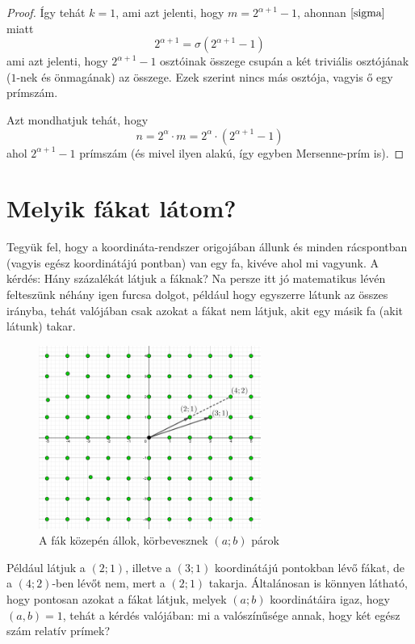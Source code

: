 \documentclass[12pt]{book}
\theoremstyle{plain} %
\theoremstyle{definition} %
\theoremstyle{remark}
\numberwithin{equation}{section}  %
\begin{document}
\begin{proof}
		Így tehát $k=1$, ami azt jelenti, hogy $m=2^{\alpha+1}-1$, ahonnan $\ref{sigma}$ miatt
		\[ 2^{\alpha+1} = \sigma(2^{\alpha+1}-1)  \]
		ami azt jelenti, hogy $2^{\alpha+1}-1$ osztóinak összege csupán a két triviális osztójának ($1$-nek és önmagának) az összege. Ezek szerint nincs más osztója, vagyis ő egy prímszám.
		
		Azt mondhatjuk tehát, hogy
		\[ n = 2^{\alpha} \cdot m = 2^{\alpha} \cdot (2^{\alpha+1} - 1)  \]
		ahol $2^{\alpha+1}-1$ prímszám (és mivel ilyen alakú, így egyben Mersenne-prím is).	
	\end{proof}
	
	
	\section{Melyik fákat látom?}
	
	Tegyük fel, hogy a koordináta-rendszer origojában állunk és minden rácspontban (vagyis egész koordinátájú pontban) van egy fa, kivéve ahol mi vagyunk. A kérdés: Hány százalékát látjuk a fáknak? Na persze itt jó matematikus lévén felteszünk néhány igen furcsa dolgot, például hogy egyszerre látunk az összes irányba, tehát valójában csak azokat a fákat nem látjuk, akit egy másik fa (akit látunk) takar.
	
	\begin{figure}[h] %
		\centering
		\includegraphics[height=6cm]{fak.png}
		\caption{A fák közepén állok, körbevesznek $(a;b)$ párok}\label{fak}
	\end{figure}

	Például látjuk a $(2;1)$, illetve a $(3;1)$ koordinátájú pontokban lévő fákat, de a $(4;2)$-ben lévőt nem, mert a $(2;1)$ takarja. Általánosan is könnyen látható, hogy pontosan azokat a fákat látjuk, melyek $(a;b)$ koordinátáira igaz, hogy $(a,b)=1$, tehát a kérdés valójában: mi a valószínűsége annak, hogy két egész szám relatív prímek?
	
\end{document}
